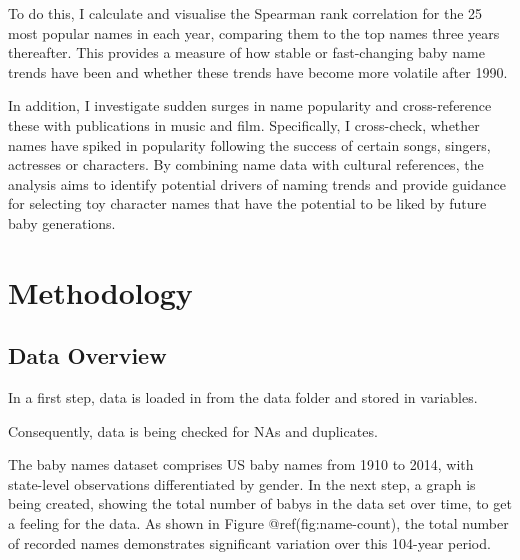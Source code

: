 \documentclass[11pt,preprint]{elsarticle}
\numberwithin{equation}{section}
\numberwithin{figure}{section}
\numberwithin{table}{section}
\begin{document}
To do this, I calculate and visualise the Spearman rank correlation for
the 25 most popular names in each year, comparing them to the top names
three years thereafter. This provides a measure of how stable or
fast-changing baby name trends have been and whether these trends have
become more volatile after 1990.

In addition, I investigate sudden surges in name popularity and
cross-reference these with publications in music and film. Specifically,
I cross-check, whether names have spiked in popularity following the
success of certain songs, singers, actresses or characters. By combining
name data with cultural references, the analysis aims to identify
potential drivers of naming trends and provide guidance for selecting
toy character names that have the potential to be liked by future baby
generations.

\section{Methodology}\label{methodology}

\subsection{Data Overview}\label{data-overview}

In a first step, data is loaded in from the data folder and stored in
variables.

\begin{Shaded}
\begin{Highlighting}[]
\OtherTok{\textless{}{-}} \NormalTok{(}\NormalTok{)}
\OtherTok{\textless{}{-}} \NormalTok{(}\NormalTok{)}
\OtherTok{\textless{}{-}} \NormalTok{(}\NormalTok{)}
\OtherTok{\textless{}{-}} \NormalTok{(}\NormalTok{)}
\end{Highlighting}
\end{Shaded}

Consequently, data is being checked for NAs and duplicates.

The baby names dataset comprises US baby names from 1910 to 2014, with
state-level observations differentiated by gender. In the next step, a
graph is being created, showing the total number of babys in the data
set over time, to get a feeling for the data. As shown in Figure
@ref(fig:name-count), the total number of recorded names demonstrates
significant variation over this 104-year period.
\end{document}
